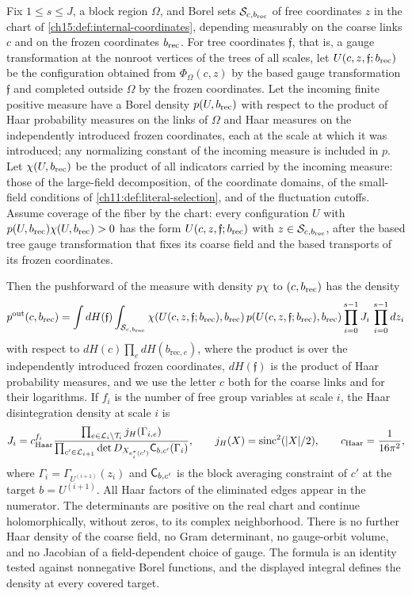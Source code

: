 \begin{lemma}\label{ch15:lem:regional-coarea}
Fix $1\le s\le J$, a block region $\Omega$, and Borel sets $\mathcal S_{c,b_{\mathrm{rec}}}$ of free coordinates $z$ in the chart of \cref{ch15:def:internal-coordinates}, depending measurably on the coarse links $c$ and on the frozen coordinates $b_{\mathrm{rec}}$. For tree coordinates $\mathfrak f$, that is, a gauge transformation at the nonroot vertices of the trees of all scales, let $U(c,z,\mathfrak f;b_{\mathrm{rec}})$ be the configuration obtained from $\Phi_\Omega(c,z)$ by the based gauge transformation $\mathfrak f$ and completed outside $\Omega$ by the frozen coordinates. Let the incoming finite positive measure have a Borel density $p(U,b_{\mathrm{rec}})$ with respect to the product of Haar probability measures on the links of $\Omega$ and Haar measures on the independently introduced frozen coordinates, each at the scale at which it was introduced; any normalizing constant of the incoming measure is included in $p$. Let $\chi(U,b_{\mathrm{rec}})$ be the product of all indicators carried by the incoming measure: those of the large-field decomposition, of the coordinate domains, of the small-field conditions of \cref{ch11:def:literal-selection}, and of the fluctuation cutoffs. Assume coverage of the fiber by the chart: every configuration $U$ with $p(U,b_{\mathrm{rec}})\chi(U,b_{\mathrm{rec}})>0$ has the form $U(c,z,\mathfrak f;b_{\mathrm{rec}})$ with $z\in\mathcal S_{c,b_{\mathrm{rec}}}$, after the based tree gauge transformation that fixes its coarse field and the based transports of its frozen coordinates.

Then the pushforward of the measure with density $p\chi$ to $(c,b_{\mathrm{rec}})$ has the density
\[
 p^{\mathrm{out}}(c,b_{\mathrm{rec}})=
 \int dH(\mathfrak f)\int_{\mathcal S_{c,b_{\mathrm{rec}}}}
  \chi(U(c,z,\mathfrak f;b_{\mathrm{rec}}),b_{\mathrm{rec}})\,
  p(U(c,z,\mathfrak f;b_{\mathrm{rec}}),b_{\mathrm{rec}})
                         \prod_{i=0}^{s-1}J_i\,\prod_{i=0}^{s-1}dz_i
\]
with respect to $dH(c)\prod_{e}dH(b_{\mathrm{rec},e})$, where the product is over the independently introduced frozen coordinates, $dH(\mathfrak f)$ is the product of Haar probability measures, and we use the letter $c$ both for the coarse links and for their logarithms. If $f_i$ is the number of free group variables at scale $i$, the Haar disintegration density at scale $i$ is
\[
 J_i=c_{\mathrm{Haar}}^{f_i}
 \frac{\prod_{e\in\mathcal L_i\setminus\mathcal T_i}
                         j_H(\Gamma_{i,e})}
      {\prod_{c'\in\mathcal L_{i+1}}
       \det D_{X_{e^*_i(c')}}\mathsf C_{b,c'}(\Gamma_i)},
 \qquad j_H(X)=\operatorname{sinc}^2(|X|/2),\qquad
 c_{\mathrm{Haar}}=\frac1{16\pi^2},
\]
where $\Gamma_i=\Gamma_{U^{(i+1)}}(z_i)$ and $\mathsf C_{b,c'}$ is the block averaging constraint of $c'$ at the target $b=U^{(i+1)}$. All Haar factors of the eliminated edges appear in the numerator. The determinants are positive on the real chart and continue holomorphically, without zeros, to its complex neighborhood. There is no further Haar density of the coarse field, no Gram determinant, no gauge-orbit volume, and no Jacobian of a field-dependent choice of gauge. The formula is an identity tested against nonnegative Borel functions, and the displayed integral defines the density at every covered target.


\end{lemma}
